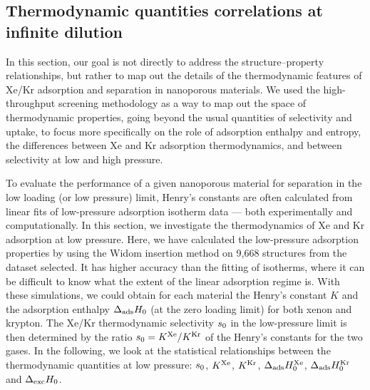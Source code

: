\documentclass[main.tex]{subfiles}
\begin{document}
\subsection{Thermodynamic quantities correlations at infinite dilution}

In this section, our goal is not directly to address the structure--property relationships, but rather to map out the details of the thermodynamic features of Xe/Kr adsorption and separation in nanoporous materials. We used the high-throughput screening methodology as a way to map out the space of thermodynamic properties, going beyond the usual quantities of selectivity and uptake, to focus more specifically on the role of adsorption enthalpy and entropy, the differences between Xe and Kr adsorption thermodynamics, and between selectivity at low and high pressure.

To evaluate the performance of a given nanoporous material for separation in the low loading (or low pressure) limit, Henry's constants are often calculated from linear fits of low-pressure adsorption isotherm data --- both experimentally and computationally. In this section, we investigate the thermodynamics of Xe and Kr adsorption at low pressure. Here, we have calculated the low-pressure adsorption properties by using the Widom insertion method\autocite{Widom1963, frenkel2001widom} on 9,668 structures from the dataset selected. It has higher accuracy than the fitting of isotherms, where it can be difficult to know what the extent of the linear adsorption regime is. With these simulations, we could obtain for each material the Henry's constant $K$ and the adsorption enthalpy $\Delta_{\text{ads}}H_{\text{0}}$ (at the zero loading limit) for both xenon and krypton. The Xe/Kr thermodynamic selectivity $s_{\text{0}}$ in the low-pressure limit is then determined by the ratio $s_{\text{0}} = K^{\text{Xe}}/K^{\text{Kr}}$ of the Henry's constants for the two gases. In the following, we look at the statistical relationships between the thermodynamic quantities at low pressure: $s_{\text{0}}$, $K^{\text{Xe}}$, $K^{\text{Kr}}$, $\Delta_{\text{ads}}H_{\text{0}}^{\text{Xe}}$, $\Delta_{\text{ads}}H_{\text{0}}^{\text{Kr}}$ and $\Delta_{\text{exc}}H_{\text{0}}$.
\end{document}
